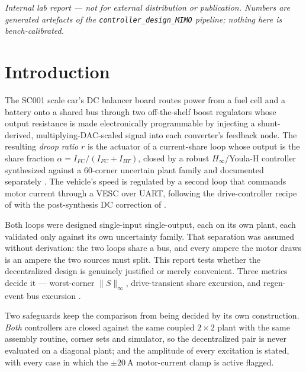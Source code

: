 \documentclass[energies,article,submit,pdftex,oneauthor]{Definitions/mdpi}
\begin{document}
\begin{center}
\itshape Internal lab report --- not for external distribution or publication. Numbers are
generated artefacts of the \textup{\texttt{controller\_design\_MIMO}} pipeline; nothing here
is bench-calibrated.
\end{center}

\section{Introduction}
\label{sec:introduction}

The SC001 scale car's DC balancer board routes power from a fuel cell and a battery onto a
shared bus through two off-the-shelf boost regulators whose output resistance is made
electronically programmable by injecting a shunt-derived, multiplying-DAC-scaled signal into
each converter's feedback node. The resulting \emph{droop ratio} $r$ is the actuator of a
current-share loop whose output is the share fraction $\alpha = I_{FC}/(I_{FC}+I_{BT})$, closed
by a robust $H_\infty$/Youla-H controller synthesized against a 60-corner uncertain plant family
and documented separately \citep{internal:droop}. The vehicle's speed is regulated by a second
loop that commands motor current through a VESC over UART, following the drive-controller recipe
of \citep{tan2025scaling} with the post-synthesis DC correction of \citep{tan2025youlah}.

Both loops were designed single-input single-output, each on its own plant, each validated only
against its own uncertainty family. That separation was assumed without derivation: the two
loops share a bus, and every ampere the motor draws is an ampere the two sources must split.
This report tests whether the decentralized design is genuinely
justified or merely convenient. Three metrics decide it --- worst-corner $\|S\|_\infty$,
drive-transient share excursion, and regen-event bus excursion \citep{internal:droop}.

Two safeguards keep the comparison from being decided by its own construction. \emph{Both}
controllers are closed against the same coupled $2\times2$ plant with the same assembly routine,
corner sets and simulator, so the decentralized pair is never evaluated on a diagonal plant; and
the amplitude of every excitation is stated, with every case in which the
$\pm\SI{20}{\ampere}$ motor-current clamp is active flagged.
\end{document}
